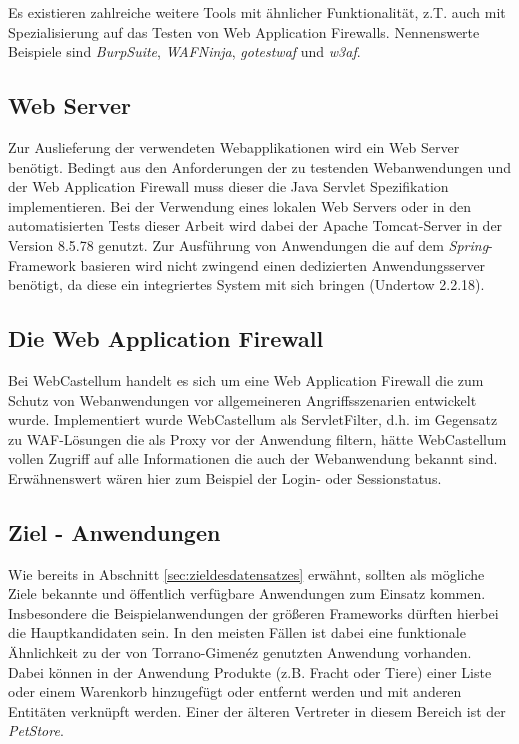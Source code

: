 Es existieren zahlreiche weitere Tools mit ähnlicher Funktionalität, z.T. auch mit Spezialisierung auf das Testen von Web Application Firewalls. Nennenswerte Beispiele sind \emph{BurpSuite}, \emph{WAFNinja}, \emph{gotestwaf} und \emph{w3af}.  

\subsection{Web Server}

Zur Auslieferung der verwendeten Webapplikationen wird ein Web Server benötigt. Bedingt aus den Anforderungen der zu testenden Webanwendungen und der Web Application Firewall muss dieser die Java Servlet Spezifikation implementieren. Bei der Verwendung eines lokalen Web Servers oder in den automatisierten Tests dieser Arbeit wird dabei der Apache Tomcat-Server in der Version 8.5.78 genutzt. Zur Ausführung von Anwendungen die auf dem \emph{Spring}-Framework basieren wird nicht zwingend einen dedizierten Anwendungsserver benötigt, da diese ein integriertes System mit sich bringen (Undertow 2.2.18).

\subsection{Die Web Application Firewall}
Bei WebCastellum handelt es sich um eine Web Application Firewall die zum Schutz von Webanwendungen vor allgemeineren Angriffsszenarien entwickelt wurde. Implementiert wurde WebCastellum als ServletFilter, d.h. im Gegensatz zu WAF-Lösungen die als Proxy vor der Anwendung filtern, hätte WebCastellum vollen Zugriff auf alle Informationen die auch der Webanwendung bekannt sind. Erwähnenswert wären hier zum Beispiel der Login- oder Sessionstatus. 


\subsection{Ziel - Anwendungen}

Wie bereits in Abschnitt \ref{sec:zieldesdatensatzes} erwähnt, sollten als mögliche Ziele bekannte und öffentlich verfügbare Anwendungen zum Einsatz kommen. Insbesondere die Beispielanwendungen der größeren Frameworks dürften hierbei die Hauptkandidaten sein. In den meisten Fällen ist dabei eine funktionale Ähnlichkeit zu der von Torrano-Gimenéz genutzten Anwendung vorhanden. Dabei können in der Anwendung Produkte (z.B. Fracht oder Tiere) einer Liste oder einem Warenkorb hinzugefügt oder entfernt werden und mit anderen Entitäten verknüpft werden. Einer der älteren Vertreter in diesem Bereich ist der \emph{PetStore}.

